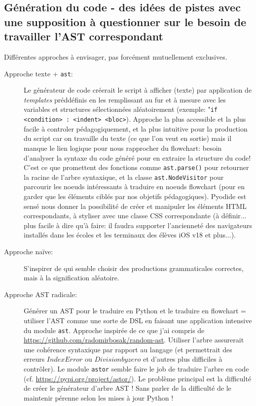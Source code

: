 \documentclass[11pt,a4paper]{article}
\begin{document}
\subsection*{Génération du code - des idées de pistes avec une supposition à questionner sur le besoin de travailler l'AST correspondant}

Différentes approches à envisager, pas forcément mutuellement exclusives.

\begin{description}
    \item[Approche texte + \texttt{ast}:] Le générateur de code créerait le script à afficher (texte) par application de \textit{templates} préddéfinis en les remplissant au fur et à mesure avec les variables et structures sélectionnées aléatoirement (exemple: "\texttt{if <condition> : <indent> <bloc>}). Approche la plus accessible et la plus facile à controler pédagogiquement, et la plus intuitive pour la production du script car on travaille du texte (ce que l'on veut en sortie) mais il manque le lien logique pour nous rapprocher du flowchart: besoin d'analyser la syntaxe du code généré pour en extraire la structure du code! C'est ce que promettent des fonctions comme \texttt{ast.parse()} pour retourner la racine de l'arbre syntaxique, et la classe \texttt{ast.NodeVisitor} pour parcourir les noeuds intéressants à traduire en noeuds flowchart (pour en garder que les éléments ciblés par nos objetifs pédagogiques). Pyodide est sensé nous donner la possibilité de créer et manipuler les éléments HTML correspondants, à styliser avec une classe CSS correspondante (à définir... plus facile à dire qu'à faire: il faudra supporter l'ancienneté des navigateurs installés dans les écoles et les terminaux des élèves iOS v18 et plus...).
     
     \item[Approche naïve:] S'inspirer de \cite{fuzzingbook} qui semble choisir des productions grammaticales correctes, mais à la signification aléatoire. 

     \item [Approche AST radicale:] Générer un AST pour le traduire en Python et le traduire en flowchart = utiliser l'AST comme une sorte de DSL en faisant une application intensive du module \texttt{ast}. Approche inspirée de ce que j'ai compris de \url{https://github.com/radomirbosak/random-ast}. Utiliser l'arbre assurerait une cohérence syntaxique par rapport au langage (et permettrait des erreurs $Index Error$ ou $Division by zero$ et d'autres plus difficiles à contrôler). Le module \texttt{astor} semble faire le job de traduire l'arbre en code (cf. \url{https://pypi.org/project/astor/}). Le problème principal est la difficulté de créer le générateur d'arbre AST ! Sans parler de la difficulté de le maintenir pérenne selon les mises à jour Python !
     

\end{description}
\end{document}
